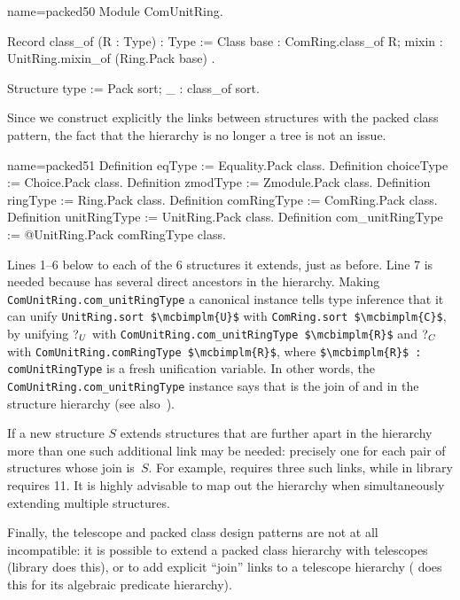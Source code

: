 \begin{coq}{name=packed50}{}
Module ComUnitRing.
  
Record class_of (R : Type) : Type := Class {
  base : ComRing.class_of R;
  mixin : UnitRing.mixin_of (Ring.Pack base)
}.

Structure type := Pack {sort; _ : class_of sort}.
\end{coq}

Since we construct explicitly the links between structures with the
packed class pattern, the fact that the hierarchy is no longer a tree
is not an issue.

\begin{coq}{name=packed51}{}
Definition eqType := Equality.Pack class.
Definition choiceType := Choice.Pack class.
Definition zmodType := Zmodule.Pack class.
Definition ringType := Ring.Pack class.
Definition comRingType := ComRing.Pack class.
Definition unitRingType := UnitRing.Pack class.
Definition com_unitRingType := @UnitRing.Pack comRingType class.
\end{coq}

Lines 1--6 below  to each of the 6 structures it
extends, just as before. Line 7 is needed because 
has several direct ancestors in the hierarchy.  Making
\lstinline/ComUnitRing.com_unitRingType/ a canonical 
instance tells type inference that it can unify
\lstinline/UnitRing.sort $\mcbimplm{U}$/ with
\lstinline/ComRing.sort $\mcbimplm{C}$/, by unifying $\mbox{?}_{U}$ with
\lstinline/ComUnitRing.com_unitRingType $\mcbimplm{R}$/ and
$\mbox{?}_{C}$ with
\lstinline/ComUnitRing.comRingType $\mcbimplm{R}$/,
where \lstinline/$\mcbimplm{R}$ : comUnitRingType/
is a fresh unification variable.
In other words, the \lstinline/ComUnitRing.com_unitRingType/ instance
says that  is the join of
 and  in the structure hierarchy (see
also~\cite[Section 5]{mahboubi:hal-00816703}).

If a new structure $S$ extends structures that are further apart in
the hierarchy more than one such additional link may be needed:
precisely one for each pair of structures whose join is~$S$. For example,
 requires three such links, while
 in library  requires 11. It is highly
advisable to map out the hierarchy when simultaneously extending
multiple structures.

Finally, the telescope and packed class design patterns are not
at all incompatible: it is possible to extend a packed class
hierarchy with telescopes (library  does this), or to add
explicit ``join'' links to a telescope hierarchy ( does this
for its algebraic predicate hierarchy).

